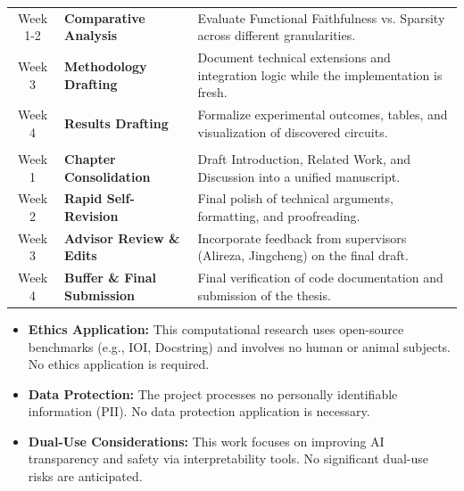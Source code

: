 \documentclass[
    IMRAD=false,
	english,
	ruledheaders=section, %
	class=report, %
	thesis={type=bachelor}, %
	accentcolor=9c, %
	custommargins=false,%
	marginpar=false,%
	parskip=half,%
	fontsize=11pt,%
]{tudapub}
\begin{document}
\begin{xltabular}{\textwidth}{|c|M{5cm}|p{10cm}|}
      \\ 
    \hline
    Week 1-2 & \textbf{Comparative Analysis} & Evaluate Functional Faithfulness vs. Sparsity across different granularities. \\
    \hdashline
    Week 3 & \textbf{Methodology Drafting} & Document technical extensions and integration logic while the implementation is fresh. \\
    \hdashline
    Week 4 & \textbf{Results Drafting} & Formalize experimental outcomes, tables, and visualization of discovered circuits. \\
    \hline

      \\ 
    \hline
    Week 1 & \textbf{Chapter Consolidation} & Draft Introduction, Related Work, and Discussion into a unified manuscript. \\
    \hdashline
    Week 2 & \textbf{Rapid Self-Revision} & Final polish of technical arguments, formatting, and proofreading. \\
    \hdashline
    Week 3 & \textbf{Advisor Review \& Edits} & Incorporate feedback from supervisors (Alireza, Jingcheng) on the final draft. \\
    \hdashline
    Week 4 & \textbf{Buffer \& Final Submission} & Final verification of code documentation and submission of the thesis. \\
    \hline

\end{xltabular}

\newpage
\label{ch:ethics}


\label{section:integrity_app}

\begin{itemize}
    \item \textbf{Ethics Application:} This computational research uses open-source benchmarks (e.g., IOI, Docstring) and involves no human or animal subjects. No ethics application is required.
    \item \textbf{Data Protection:} The project processes no personally identifiable information (PII). No data protection application is necessary.
    \item \textbf{Dual-Use Considerations:} This work focuses on improving AI transparency and safety via interpretability tools. No significant dual-use risks are anticipated.
\end{itemize}
\end{document}
